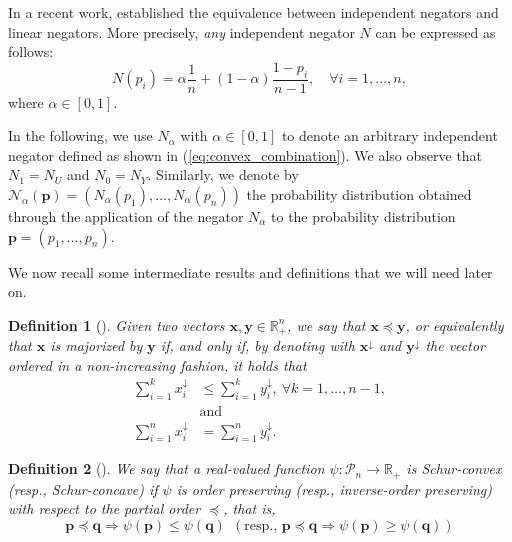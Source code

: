 \documentclass[pdflatex,sn-basic,iicol]{sn-jnl}%
\theoremstyle{thmstyleone}%
\theoremstyle{thmstyletwo}%
\theoremstyle{thmstylethree}%
\newtheorem{definition}{Definition}%
\newcommand{\N}{\mathcal{N}}
\newcommand{\cP}{\mathcal{P}}
\newcommand{\bp}{\mathbf{p}}
\newcommand{\bq}{\mathbf{q}}
\newcommand{\x}{\mathbf{x}}
\newcommand{\y}{\mathbf{y}}
\begin{document}
{In a recent work, \cite{klein2022some} established the equivalence between  independent negators and linear negators. More precisely, \textit{any} independent negator $N$ can be expressed as follows:
\begin{equation}
    \label{eq:convex_combination}
    N(p_i) = \alpha\frac{1}{n} + (1-\alpha)\frac{1-p_i}{n-1}, \quad \forall i=1,\dots,n,
\end{equation}
where $\alpha\in[0,1]$.

In the following, we use $N_{\alpha}$ with $\alpha\in[0,1]$ to denote an arbitrary independent negator defined as shown in (\ref{eq:convex_combination}). We also observe that $N_1 = N_U$ and $N_0 = N_Y$. Similarly, we denote by $\N_{\alpha}(\bp)=
(N_\alpha(p_1), \ldots, N_\alpha(p_n))$ the probability distribution obtained through the application of the negator $N_{\alpha}$ to the probability distribution $\bp=(p_1, \ldots , p_n)$.}


We now recall some intermediate results and definitions that we will need later on.

\begin{definition}[\cite{marshall1979inequalities}]
    Given two vectors $\x, \y \in \mathbb{R}_+^n $, we say that $\x \preceq \y$, or equivalently that $\x$ is \textit{majorized} by $\y$  if, and only if, by denoting with $\x^{\downarrow}$ and $\y^{\downarrow}$ the vector ordered in a non-increasing fashion, it holds that
\begin{align*}
    \sum_{i=1}^k x^{\downarrow}_i &\leq \sum_{i=1}^k y^{\downarrow}_i,\:\forall k=1,\dots,n-1,\\&\text{and}\\
    \sum_{i=1}^n  x^{\downarrow}_i &=\sum_{i=1}^n y^{\downarrow}_i.
\end{align*}
\end{definition}

\begin{definition}[\cite{marshall1979inequalities}]\label{def:schur}
We say that a real-valued function $\psi:\cP_n \to \mathbb{R}_+$ is Schur-convex (resp., Schur-concave) if $\psi$ is order preserving (resp., inverse-order preserving) with respect to the partial order $\preceq$, that is, 
\begin{equation*}
    \bp\preceq \bq \Rightarrow \psi(\bp) \leq \psi(\bq)\:\:(\text{resp., }\bp\preceq \bq \Rightarrow \psi(\bp) \geq \psi(\bq))
\end{equation*}
\end{definition}
\end{document}
